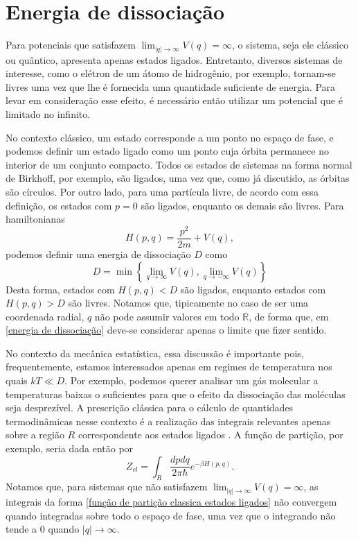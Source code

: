 \documentclass[
	12pt,
	oneside,			%
	a4paper,			%
	english,			%
	brazil				%
	]{abntex2}
\theoremstyle{definition}
\begin{document}
\section{Energia de dissociação}

Para potenciais que satisfazem $\lim_{|q| \to \infty} V(q) = \infty$, o sistema, seja ele clássico ou quântico, apresenta apenas estados ligados. Entretanto, diversos sistemas de interesse, como o elétron de um átomo de hidrogênio, por exemplo, tornam-se livres uma vez que lhe é fornecida uma quantidade suficiente de energia. Para levar em consideração esse efeito, é necessário então utilizar um potencial que é limitado no infinito.

No contexto clássico, um estado corresponde a um ponto no espaço de fase, e podemos definir um estado ligado como um ponto cuja órbita permanece no interior de um conjunto compacto. Todos os estados de sistemas na forma normal de Birkhoff, por exemplo, são ligados, uma vez que, como já discutido, as órbitas são círculos. Por outro lado, para uma partícula livre, de acordo com essa definição, os estados com $p=0$ são ligados, enquanto os demais são livres. Para hamiltonianas
\begin{equation}
    H(p,q) = \frac{p^2}{2m} + V\left( q \right),
\end{equation}
podemos definir uma energia de dissociação $D$ como
\begin{equation}
\label{energia de dissociação}
    D = \min \left\{ \lim_{q \to \infty} V(q), \lim_{q \to -\infty} V(q) \right\}
\end{equation}
Desta forma, estados com $H(p,q) < D$ são ligados, enquanto estados com $H(p,q) > D$ são livres. Notamos que, tipicamente no caso de ser uma coordenada radial, $q$ não pode assumir valores em todo $\mathbb{R}$, de forma que, em \eqref{energia de dissociação} deve-se considerar apenas o limite que fizer sentido.

No contexto da mecânica estatística, essa discussão é importante pois, frequentemente, estamos interessados apenas em regimes de temperatura nos quais $kT \ll D$. Por exemplo, podemos querer analisar um gás molecular a temperaturas baixas o suficientes para que o efeito da dissociação das moléculas seja desprezível. A prescrição clássica para o cálculo de quantidades termodinâmicas nesse contexto é a realização das integrais relevantes apenas sobre a região $R$ correspondente aos estados ligados \cite{riganelli2001rovibrational}. A função de partição, por exemplo, seria dada então por
\begin{equation}
\label{função de partição classica estados ligados}
    Z_{cl} = \int_R \frac{dp dq}{2\pi \hbar} e^{-\beta H(p,q)}.
\end{equation}
Notamos que, para sistemas que não satisfazem $\lim_{|q| \to \infty} V(q) = \infty$, as integrais da forma \eqref{função de partição classica estados ligados} não convergem quando integradas sobre todo o espaço de fase, uma vez que o integrando não tende a $0$ quando $|q| \to \infty$.
\end{document}
